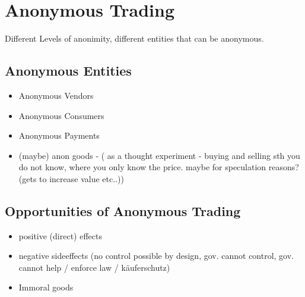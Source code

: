 \section{Anonymous Trading}

Different Levels of anonimity, different entities that can be anonymous.

\subsection{Anonymous Entities}

\begin{itemize}
    \item Anonymous Vendors
    \item Anonymous Consumers
    \item Anonymous Payments
    \item (maybe) anon goods - ( as a thought experiment - buying and selling sth you do not know, where you only know the price. maybe for speculation reasons? (gets to increase value etc..))
\end{itemize}

\subsection{Opportunities of Anonymous Trading}

\begin{itemize}
    \item positive (direct) effects
    \item negative sideeffects (no control possible by design, gov. cannot control, gov. cannot help / enforce law / käuferschutz)
    \item Immoral goods
\end{itemize}

